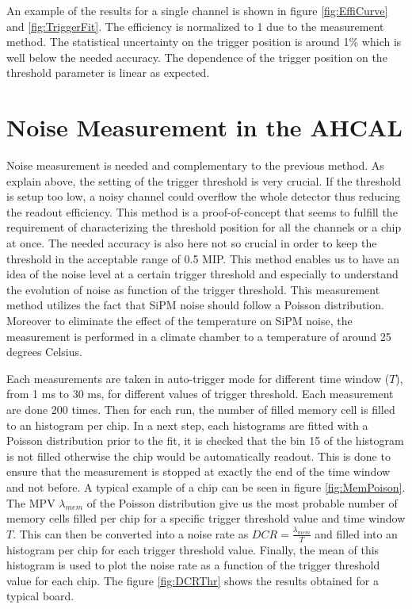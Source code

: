 An example of the results for a single channel is shown in figure \ref{fig:EffiCurve} and \ref{fig:TriggerFit}. The efficiency is normalized to 1 due to the measurement method. The statistical uncertainty on the trigger position is around 1\% which is well below the needed accuracy. The dependence of the trigger position on the threshold parameter is linear as expected.

\section{Noise Measurement in the AHCAL}

Noise measurement is needed and complementary to the previous method. As explain above, the setting of the trigger threshold is very crucial. If the threshold is setup too low, a noisy channel could overflow the whole detector thus reducing the readout efficiency. This method is a proof-of-concept that seems to fulfill the requirement of characterizing the threshold position for all the channels or a chip at once. The needed accuracy is also here not so crucial in order to keep the threshold in the acceptable range of 0.5 MIP. This method enables us to have an idea of the noise level at a certain trigger threshold and especially to understand the evolution of noise as function of the trigger threshold. This measurement method utilizes the fact that SiPM noise should follow a Poisson distribution. Moreover to eliminate the effect of the temperature on SiPM noise, the measurement is performed in a climate chamber to a temperature of around 25 degrees Celsius.

Each measurements are taken in auto-trigger mode for different time window ($T$), from 1 ms to 30 ms, for different values of trigger threshold. Each measurement are done 200 times. Then for each run, the number of filled memory cell is filled to an histogram per chip. In a next step, each histograms are fitted with a Poisson distribution prior to the fit, it is checked that the bin 15 of the histogram is not filled otherwise the chip would be automatically readout. This is done to ensure that the measurement is stopped at exactly the end of the time window and not before. A typical example of a chip can be seen in figure \ref{fig:MemPoison}. The MPV $\lambda_{mem}$ of the Poisson distribution give us the most probable number of memory cells filled per chip for a specific trigger threshold value and time window $T$. This can then be converted into a noise rate as $DCR = \frac{\lambda_{mem}}{T}$ and filled into an histogram per chip for each trigger threshold value. Finally, the mean of this histogram is used to plot the noise rate as a function of the trigger threshold value for each chip. The figure \ref{fig:DCRThr} shows the results obtained for a typical board.

